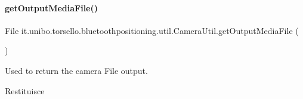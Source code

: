\paragraph{\texorpdfstring{get\+Output\+Media\+File()}{getOutputMediaFile()}}
{\footnotesize\ttfamily File it.\+unibo.\+torsello.\+bluetoothpositioning.\+util.\+Camera\+Util.\+get\+Output\+Media\+File (\begin{DoxyParamCaption}{ }\end{DoxyParamCaption})\hspace{0.3cm}{\ttfamily [private]}}

Used to return the camera File output.

\begin{DoxyReturn}{Restituisce}

\end{DoxyReturn}

